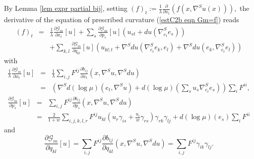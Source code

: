 \documentclass[10pt,reqno,oneside]{amsart}
\theoremstyle{definition}
\theoremstyle{remark}
\begin{document}
By Lemma \ref{lem expr partial bij}, setting $(f)_t:=\frac{1}{\lambda}\frac{\partial}{\partial x_t}\left(f(x,\nabla^Su(x))\right),$ the derivative of the equation of prescribed curvature (\ref{estC2b eqn Gm=f}) reads
\begin{eqnarray}\label{eq presc curv derivee interm}
(f)_t&=&
\frac{1}{\lambda}\frac{\partial\mathcal{G}_m}{\partial x_t}[u]+\sum_s\frac{\partial\mathcal{G}_m}{\partial p_s}[u]\left(u_{st}+du(\nabla^S_{e_t}e_s)\right)\nonumber\\
&&+\sum_{k,l}\frac{\partial\mathcal{G}_m}{\partial q_{kl}}[u] \left(u_{kl;t}+\nabla^S du(\nabla^S_{e_t}e_k,e_l)+\nabla^S du(e_k,\nabla^S_{e_t}e_l)\right)\label{eq presc curv derivee interm}
\end{eqnarray}
with
\begin{eqnarray*}
\frac{1}{\lambda}\frac{\partial\mathcal{G}_m}{\partial x_t}[u]&=&\frac{1}{\lambda}\sum_{i,j}F^{ij}\frac{\partial b_{ij}}{\partial x_t}(x,\nabla^S u,\nabla^S du)\\
&=&\left(\nabla^S d(\log\mu)(e_t,\nabla^S u)+d(\log\mu)(\sum_su_s\nabla^S_{e_t}e_s)\right)\sum_{i}F^{ii},
\end{eqnarray*}
\begin{eqnarray}
\frac{\partial\mathcal{G}_m}{\partial p_s}[u]&=&\sum_{i,j}F^{ij}\frac{\partial b_{ij}}{\partial p_s}(x,\nabla^S u,\nabla^S du)\nonumber\\
&=&\frac{2}{1+w}\sum_{i,j,k,l,r}F^{ij}u_{kl}\left(u_r\gamma_{is}+\frac{u_i}{w}\gamma_{rs}\right)\gamma_{rk}\gamma_{lj}+d(\log \mu)(e_s)\sum_{i}F^{ii}\label{est C2b Gm ps}
\end{eqnarray}
and 
\begin{equation}\label{est C2b Gm qkl Fii}
\frac{\partial\mathcal{G}_m}{\partial q_{kl}}[u] =\sum_{i,j}F^{ij}\frac{\partial b_{ij}}{\partial q_{kl}}(x,\nabla^S u,\nabla^S du)=\sum_{i,j}F^{ij}\gamma_{ik}\gamma_{lj}.
\end{equation}
\end{document}
